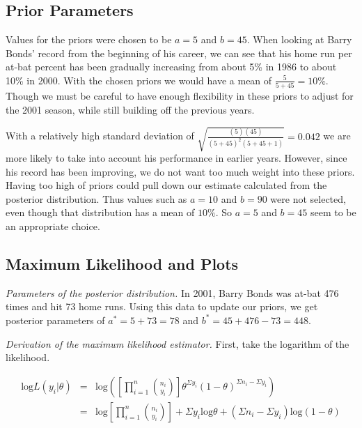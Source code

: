 \documentclass[12pt]{article}
\begin{document}
\subsection{Prior Parameters}

\noindent Values for the priors were chosen to be $a=5$ and $b=45$.  When looking at Barry Bonds' record from the beginning of his career, we can see that his home run per at-bat percent has been gradually increasing from about 5\% in 1986 to about 10\% in 2000.  With the chosen priors we would have a mean of $\frac{5}{5+45}=10\%$.  Though we must be careful to have enough flexibility in these priors to adjust for the 2001 season, while still building off the previous years.
\bigskip

\noindent With a relatively high standard deviation of $\sqrt{\frac{(5)(45)}{(5+45)^2(5+45+1)}}=0.042$ we are more likely to take into account his performance in earlier years.  However, since his record has been improving, we do not want too much weight into these priors.  Having too high of priors could pull down our estimate calculated from the posterior distribution.  Thus values such as $a=10$ and $b=90$ were not selected, even though that distribution has a mean of $10\%$.  So $a=5$ and $b=45$ seem to be an appropriate choice.
\bigskip


\subsection{Maximum Likelihood and Plots}



\noindent \textit{Parameters of the posterior distribution.}  In 2001, Barry Bonds was at-bat 476 times and hit 73 home runs.  Using this data to update our priors, we get posterior parameters of $a^*=5+73=78$ and $b^*=45+476-73=448$.
\bigskip

\noindent \textit{Derivation of the maximum likelihood estimator.}  First, take the logarithm of the likelihood.

\begin{eqnarray*}
\mathrm{log}L(y_i|\theta)&=& \mathrm{log}\left(\left[\prod_{i=1}^n{n_i \choose y_i}\right]\theta^{\Sigma y_i}(1-\theta)^{\Sigma n_i-\Sigma y_i}\right) \\
&=& \mathrm{log}\left[\prod_{i=1}^n{n_i \choose y_i}\right]+\Sigma y_i\mathrm{log}\theta+(\Sigma n_i-\Sigma y_i)\mathrm{log}(1-\theta) \\
\end{eqnarray*}
\end{document}
